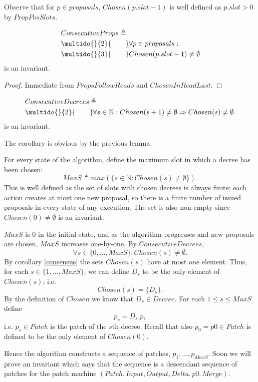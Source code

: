 \documentclass[12pt,a4paper,en]{pracamgr}
\newcommand{\mbb}[1]{\mathbb{#1}}
\newcommand{\ind}[1]{\multido{}{#1}{\qquad}}
\begin{document}
Observe that for $p \in proposals$, $Chosen(p.slot - 1)$ is well defined as $p.slot > 0$ by $PropPosSlots$.

\begin{lemma}
    \begin{align*}
        & ConsecutiveProps \triangleq\\
        & \ind{2} \forall p \in proposals:\\
        & \ind{3} Chosen(p.slot - 1) \neq \emptyset
    \end{align*}
    is an invariant.
\end{lemma}
\begin{proof}
    Immediate from $PropsFollowReads$ and $ChosenInReadLast$.
\end{proof}

\begin{coro}
    \begin{align*}
        & ConsecutiveDecrees \triangleq\\
        & \ind{2} \forall s \in \mbb N: Chosen(s + 1) \neq \emptyset \Rightarrow Chosen(s) \neq \emptyset.
    \end{align*}
    is an invariant.
\end{coro}

The corollary is obvious by the previous lemma.

For every state of the algorithm, define the maximum slot in which a decree has been chosen:
$$ MaxS \triangleq max(\{s \in \mbb N: Chosen(s) \neq \emptyset\}). $$
This is well defined as the set of slots with chosen decrees is always finite; each action creates at most one new proposal, so there is a finite number of issued proposals in every state of any execution. The set is also non-empty since $Chosen(0) \neq \emptyset$ is an invariant.

$MaxS$ is $0$ in the initial state, and as the algorithm progresses and new proposals are chosen, $MaxS$ increases one-by-one. By $ConsecutiveDecrees$,
$$ \forall s \in \{0, \dots, MaxS\}: Chosen(s) \neq \emptyset. $$
By corollary \ref{consensus} the sets $Chosen(s)$ have at most one element. Thus, for each $s \in \{1, \dots, MaxS\}$, we can define $D_s$ to be the only element of $Chosen(s)$; i.e.
$$ Chosen(s) = \{D_s\}. $$
By the definition of $Chosen$ we know that $D_s \in Decree$. For each $1 \le s \le MaxS$ define
$$ p_s = D_s.p, $$
i.e. $p_s \in Patch$ is the patch of the $s$th decree. Recall that also $p_0 = p0 \in Patch$ is defined to be the only element of $Chosen(0)$.

Hence the algorithm constructs a sequence of patches, $p_1, \dots, p_{MaxS}$. Soon we will prove an invariant which says that the sequence is a descendant sequence of patches for the patch machine $(Patch, Input, Output, Delta, p0, Merge)$.
\end{document}

